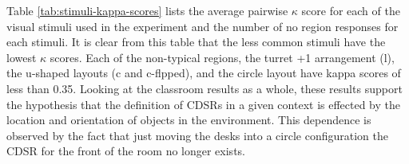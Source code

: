 \documentclass[11pt,letterpaper]{article}
\begin{document}

Table \ref{tab:stimuli-kappa-scores} lists the average pairwise $\kappa$ score for each of the visual stimuli used in the experiment and the number of no region responses for each stimuli.  It is clear from this table that the less common stimuli have the lowest $\kappa$ scores.  Each of the non-typical regions, the turret +1 arrangement (l), the u-shaped layouts (c and c-flpped), and the circle layout have kappa scores of less than 0.35. Looking at the classroom results as a whole, these results support the hypothesis that the definition of CDSRs in a given context is effected by the location and orientation of objects in the environment.  This dependence is observed by the fact that just moving the desks into a circle configuration the CDSR for the front of the room no longer exists.

\end{document}
